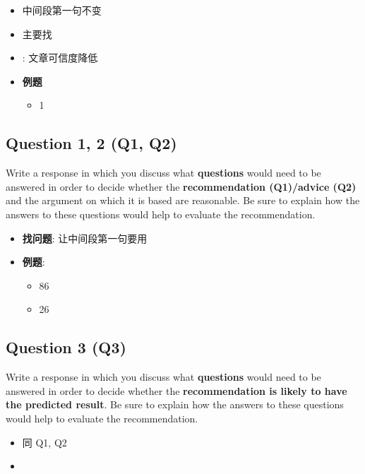     \begin{itemize}
      \item 中间段第一句不变
      \item 主要找 
      \item {}: 文章可信度降低
      \item \textbf{例题}
      \begin{itemize}
        \item 1
      \end{itemize}
    \end{itemize}

  \subsection{Question 1, 2 (Q1, Q2)}

    Write a response in which you discuss what \textbf{questions} would need to
    be answered in order to decide whether the
    \textbf{recommendation (Q1)/advice (Q2)} and the argument on which it is
    based are reasonable. Be sure to explain how the answers to these questions
    would help to evaluate the recommendation.

    \begin{itemize}
      \item \textbf{找问题}: 让中间段第一句要用
      \item \textbf{例题}:
      \begin{itemize}
        \item 86
        \item 26
      \end{itemize}
    \end{itemize}

  \subsection{Question 3 (Q3)}

    Write a response in which you discuss what \textbf{questions} would need
    to be answered in order to decide whether the
    \textbf{recommendation is likely to have the predicted result}. Be sure
    to explain how the answers to these questions would help to evaluate the
    recommendation.

    \begin{itemize}
      \item 同 Q1, Q2
      \item {}
    \end{itemize}

